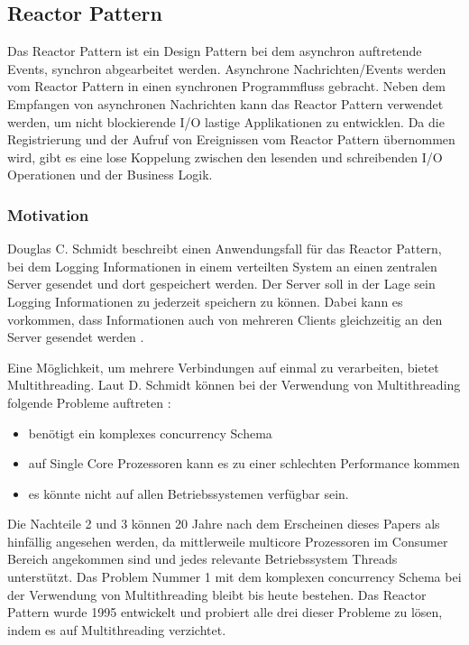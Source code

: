 \subsection{Reactor Pattern}
\label{section:Reactor Pattern}

Das Reactor Pattern ist ein Design Pattern bei dem asynchron auftretende Events, synchron abgearbeitet werden. Asynchrone Nachrichten/Events werden vom Reactor Pattern in einen synchronen Programmfluss gebracht. Neben dem Empfangen von asynchronen Nachrichten kann das Reactor Pattern verwendet werden, um nicht blockierende I/O lastige Applikationen zu entwicklen. Da die Registrierung und der Aufruf von Ereignissen vom Reactor Pattern übernommen wird, gibt es eine lose Koppelung zwischen den lesenden und schreibenden I/O Operationen und der Business Logik. \cite[p. 1]{Sch95}

\subsubsection{Motivation}
\label{section:reactor_motivation}

Douglas C. Schmidt beschreibt einen Anwendungsfall für das Reactor Pattern, bei dem Logging Informationen in einem verteilten System an einen zentralen Server gesendet und dort gespeichert werden. Der Server soll in der Lage sein Logging Informationen zu jederzeit speichern zu können. Dabei kann es vorkommen, dass Informationen auch von mehreren Clients gleichzeitig an den Server gesendet werden \cite[p. 1]{Sch95}. 

Eine Möglichkeit, um mehrere Verbindungen auf einmal zu verarbeiten, bietet Multithreading. Laut D. Schmidt können bei der Verwendung von Multithreading folgende Probleme auftreten \cite[p. 1]{Sch95}: 

\begin{itemize}
  \item benötigt ein komplexes concurrency Schema
  \item auf Single Core Prozessoren kann es zu einer schlechten Performance kommen
  \item es könnte nicht auf allen Betriebssystemen verfügbar sein.
\end{itemize}

Die Nachteile 2 und 3 können 20 Jahre nach dem Erscheinen dieses Papers als hinfällig angesehen werden, da mittlerweile multicore Prozessoren im Consumer Bereich angekommen sind und jedes relevante Betriebssystem Threads unterstützt. Das Problem Nummer 1 mit dem komplexen concurrency Schema bei der Verwendung von Multithreading bleibt bis heute bestehen. Das Reactor Pattern wurde 1995 entwickelt und probiert alle drei dieser Probleme zu lösen, indem es auf Multithreading verzichtet.

